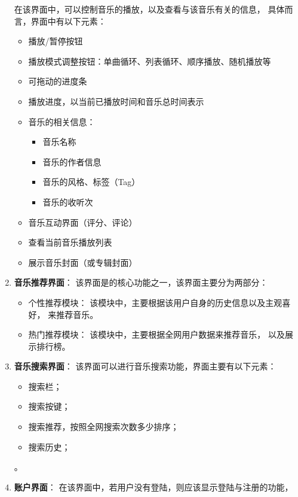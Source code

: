 \begin{enumerate}
        在该界面中，可以控制音乐的播放，以及查看与该音乐有关的信息，
        具体而言，界面中有以下元素：
        \begin{itemize}
            \item 播放/暂停按钮
            \item 播放模式调整按钮：单曲循环、列表循环、顺序播放、随机播放等
            \item 可拖动的进度条
            \item 播放进度，以当前已播放时间和音乐总时间表示
            \item 音乐的相关信息：
            \begin{itemize}
                \item 音乐名称
                \item 音乐的作者信息
                \item 音乐的风格、标签（Tag）
                \item 音乐的收听次
            \end{itemize}
            \item 音乐互动界面（评分、评论）
            \item 查看当前音乐播放列表
            \item 展示音乐封面（或专辑封面）
        \end{itemize}
    \item \textbf{音乐推荐界面}：
        该界面是\proname 的核心功能之一，该界面主要分为两部分：
        \begin{itemize}
            \item 个性推荐模块：
                该模块中，主要根据该用户自身的历史信息以及主观喜好，
                来推荐音乐。
            \item 热门推荐模块：
                该模块中，主要根据全网用户数据来推荐音乐，
                以及展示排行榜。
        \end{itemize}
     \item \textbf{音乐搜索界面}：
    该界面可以进行音乐搜索功能，界面主要有以下元素：
        \begin{itemize}
            \item 搜索栏；
            \item 搜索按键；
            \item 搜索推荐，按照全网搜索次数多少排序；
            \item 搜索历史；
        \end{itemize}。
    \item \textbf{账户界面}：
        在该界面中，若用户没有登陆，则应该显示登陆与注册的功能，

\end{enumerate}
